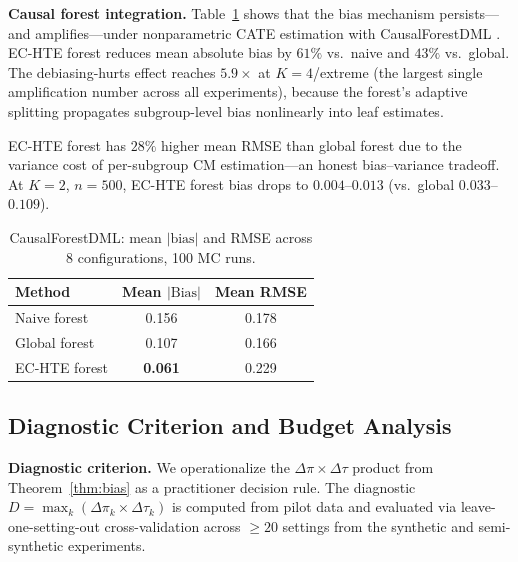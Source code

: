 \documentclass[11pt,twocolumn]{article}
\theoremstyle{remark}
\newcommand{\abs}[1]{\lvert #1 \rvert}
\begin{document}
\textbf{Causal forest integration.}
Table~\ref{tab:forest} shows that the bias mechanism persists---and amplifies---under nonparametric CATE estimation with CausalForestDML \cite{athey2019generalized}.
EC-HTE forest reduces mean absolute bias by $61\%$ vs.\ naive and $43\%$ vs.\ global.
The debiasing-hurts effect reaches $5.9\times$ at $K{=}4$/extreme (the largest single amplification number across all experiments), because the forest's adaptive splitting propagates subgroup-level bias nonlinearly into leaf estimates.

EC-HTE forest has $28\%$ higher mean RMSE than global forest due to the variance cost of per-subgroup CM estimation---an honest bias--variance tradeoff.
At $K{=}2$, $n{=}500$, EC-HTE forest bias drops to $0.004$--$0.013$ (vs.\ global $0.033$--$0.109$).

\begin{table}[t]
\centering
\small
\caption{CausalForestDML: mean $\abs{\text{bias}}$ and RMSE across 8 configurations, 100 MC runs.}
\label{tab:forest}
\begin{tabular}{lcc}
\toprule
Method & Mean $\abs{\text{Bias}}$ & Mean RMSE \\
\midrule
Naive forest & 0.156 & 0.178 \\
Global forest & 0.107 & 0.166 \\
EC-HTE forest & \textbf{0.061} & 0.229 \\
\bottomrule
\end{tabular}
\end{table}

\subsection{Diagnostic Criterion and Budget Analysis}\label{sec:diagnostic}

\textbf{Diagnostic criterion.}
We operationalize the $\Delta\pi \times \Delta\tau$ product from Theorem~\ref{thm:bias} as a practitioner decision rule.
The diagnostic $D = \max_k (\Delta\pi_k \times \Delta\tau_k)$ is computed from pilot data and evaluated via leave-one-setting-out cross-validation across ${\geq}20$ settings from the synthetic and semi-synthetic experiments.
\end{document}
